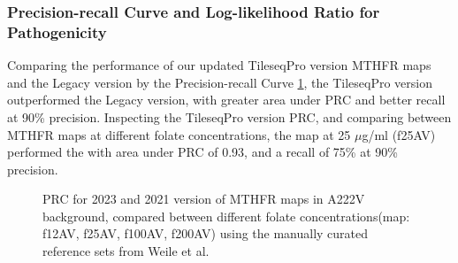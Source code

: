 \documentclass{article}
\begin{document}
\subsubsection{Precision-recall Curve and Log-likelihood Ratio for Pathogenicity}
Comparing the performance of our updated TileseqPro version MTHFR maps and the Legacy version by the Precision-recall Curve \ref{fig:PRC MTHFR in A222V Background}, the TileseqPro version outperformed the Legacy version, with greater area under PRC and better recall at 90\% precision. Inspecting the TileseqPro version PRC, and comparing between MTHFR maps at different folate concentrations, the map at 25 $\mu$g/ml (f25AV) performed the with area under PRC of 0.93, and a recall of 75\% at 90\% precision.

\begin{figure}[H]%
    \centering
    \qquad
    \caption{PRC for 2023 and 2021 version of MTHFR maps in A222V background, compared between different folate concentrations(map: f12AV, f25AV, f100AV, f200AV) using the manually curated reference sets from Weile et al.\cite{weile_shifting_2021}}%
    \label{fig:PRC MTHFR in A222V Background}%
\end{figure}
\end{document}
